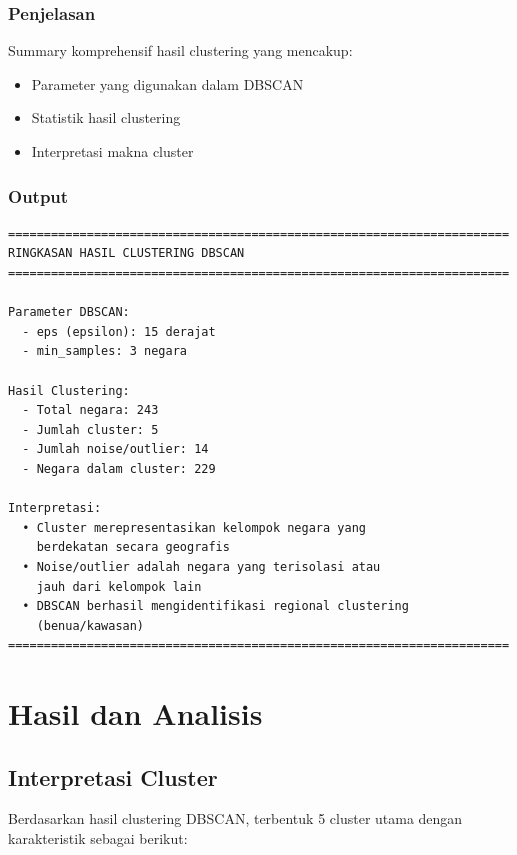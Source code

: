 \documentclass[12pt,a4paper]{article}
\begin{document}
\subsubsection{Penjelasan}
Summary komprehensif hasil clustering yang mencakup:
\begin{itemize}
    \item Parameter yang digunakan dalam DBSCAN
    \item Statistik hasil clustering
    \item Interpretasi makna cluster
\end{itemize}

\subsubsection{Output}
\begin{verbatim}
======================================================================
RINGKASAN HASIL CLUSTERING DBSCAN
======================================================================

Parameter DBSCAN:
  - eps (epsilon): 15 derajat
  - min_samples: 3 negara

Hasil Clustering:
  - Total negara: 243
  - Jumlah cluster: 5
  - Jumlah noise/outlier: 14
  - Negara dalam cluster: 229

Interpretasi:
  • Cluster merepresentasikan kelompok negara yang 
    berdekatan secara geografis
  • Noise/outlier adalah negara yang terisolasi atau 
    jauh dari kelompok lain
  • DBSCAN berhasil mengidentifikasi regional clustering 
    (benua/kawasan)
======================================================================
\end{verbatim}

\newpage
\section{Hasil dan Analisis}

\subsection{Interpretasi Cluster}

Berdasarkan hasil clustering DBSCAN, terbentuk 5 cluster utama dengan karakteristik sebagai berikut:
\end{document}
